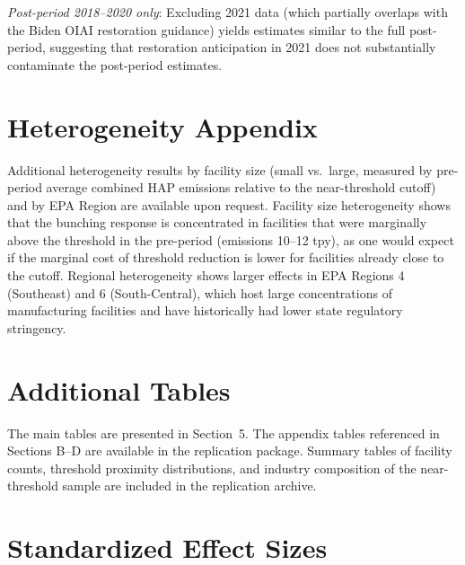\documentclass[12pt]{article}
\begin{document}
\textit{Post-period 2018--2020 only}: Excluding 2021 data (which partially overlaps with the Biden OIAI restoration guidance) yields estimates similar to the full post-period, suggesting that restoration anticipation in 2021 does not substantially contaminate the post-period estimates.

\section{Heterogeneity Appendix}
\label{sec:het_appendix}

Additional heterogeneity results by facility size (small vs.\ large, measured by pre-period average combined HAP emissions relative to the near-threshold cutoff) and by EPA Region are available upon request. Facility size heterogeneity shows that the bunching response is concentrated in facilities that were marginally above the threshold in the pre-period (emissions 10--12 tpy), as one would expect if the marginal cost of threshold reduction is lower for facilities already close to the cutoff. Regional heterogeneity shows larger effects in EPA Regions 4 (Southeast) and 6 (South-Central), which host large concentrations of manufacturing facilities and have historically had lower state regulatory stringency.

\section{Additional Tables}
\label{sec:additional_tables}

The main tables are presented in Section~5. The appendix tables referenced in Sections B--D are available in the replication package. Summary tables of facility counts, threshold proximity distributions, and industry composition of the near-threshold sample are included in the replication archive.

\section{Standardized Effect Sizes}
\label{sec:sde}


\end{document}
